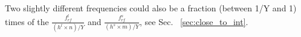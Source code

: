 Two slightly different frequencies could also be a fraction (between 1/Y and 1) times of the $\frac{f_{\mathit{rf}}^{l}}{(h^l\times n)/Y}$ and $\frac{f_{\mathit{rf}}^{s}}{(h^s\times m)/Y}$, see Sec. ~\ref{sec:close_to_int}.


%
%
